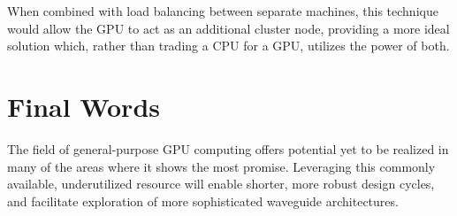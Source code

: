 When combined with load balancing between separate machines, this technique would allow the GPU to act as an additional cluster node, providing a more ideal solution which, rather than trading a CPU for a GPU, utilizes the power of both. 

\iffalse
\subsection{Machine Learning}
A high-speed simulator such as GoLightly may facilitate application of machine learning algorithms to accelerate FDTD even more. ML systems excel at identifying complex relationships and patterns. In theory, one could present simulation parameters such as waveguide architecture and composition and source wavelengths as a set of inputs into a multi-layer neural network, while simulation output is used to evaluate the fidelity of the network's predicted output. 

A trained network may be able to predict a simulation's output with a degree of accuracy sufficient to inform the design iteration process.  The ability to rapidly execute simulations should make generation of the large quantities of training data required by ML networks more feasable than traditional CPU-based systems. 
\fi

\section{Final Words}

The field of general-purpose GPU computing offers potential yet to be realized in many of the areas where it shows the most promise. Leveraging this commonly available, underutilized resource will enable shorter, more robust design cycles, and facilitate exploration of more sophisticated waveguide architectures. 









